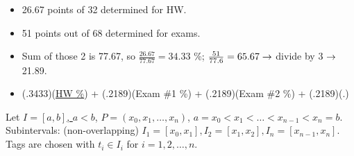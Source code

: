 \documentclass[]{article}
\begin{document}
\begin{itemize}
	\item 26.67 points of 32 determined for HW.
	\item 51 points out of 68 determined for exams.
	\item Sum of those 2 is 77.67, so $\frac{26.67}{77.67} = 34.33$ \%; $\frac{51}{77.6} = 65.67 \rightarrow$ divide by 3 $\rightarrow$ 21.89.
	\item (.3433)(\ul{HW \%}) + (.2189)(Exam \#1 \%) + (.2189)(Exam \#2 \%) + (.2189)(.)
\end{itemize}

Let \ul{$I = [a,b]$, $a<b$}, $P = (x_0,x_1,\dots,x_n)$, $a = x_0<x_1<\dots < x_{n-1} < x_n = b$. Subintervals: (non-overlapping) $I_1 = [x_0,x_1], I_2 = [x_1,x_2], I_n = [x_{n-1},x_n]$. Tags are chosen with $t_i\in I_i$ for $i = 1,2,\dots,n$.
\end{document}

